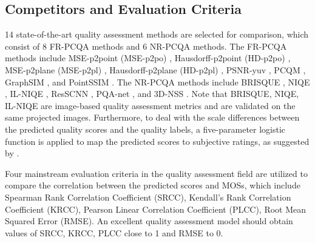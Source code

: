 \documentclass{article}
\begin{document}
\subsection{Competitors and Evaluation Criteria}
14 state-of-the-art quality assessment methods are selected for comparison, which consist of 8 FR-PCQA methods and 6 NR-PCQA methods. The FR-PCQA methods include MSE-p2point (MSE-p2po) \cite{mekuria2016evaluation}, Hausdorff-p2point (HD-p2po) \cite{mekuria2016evaluation}, MSE-p2plane (MSE-p2pl) \cite{tian2017geometric}, Hausdorff-p2plane (HD-p2pl) \cite{tian2017geometric}, PSNR-yuv \cite{torlig2018novel}, PCQM \cite{meynet2020pcqm}, GraphSIM \cite{yang2020graphsim}, and PointSSIM \cite{alexiou2020pointssim}.  The NR-PCQA methods include BRISQUE \cite{mittal2012brisque}, NIQE \cite{mittal2012making}, IL-NIQE \cite{zhang2015feature}, ResSCNN \cite{liu2022point}, PQA-net \cite{liu2021pqa}, and 3D-NSS \cite{zhang2021no}. Note that BRISQUE, NIQE, IL-NIQE are image-based quality assessment metrics and are validated on the same projected images.
Furthermore, to deal with the scale differences between the predicted quality scores and the quality labels, a five-parameter logistic function is applied to map the predicted scores to subjective ratings, as suggested by \cite{antkowiak2000final}.





Four mainstream evaluation criteria in the quality assessment field are utilized to compare the correlation between the predicted scores and MOSs, which include Spearman Rank Correlation Coefficient (SRCC), Kendall’s Rank Correlation Coefficient (KRCC), Pearson Linear Correlation Coefficient (PLCC), Root Mean Squared Error (RMSE). 
An excellent quality assessment model should obtain values of SRCC, KRCC, PLCC close to 1 and RMSE to 0.
\end{document}
